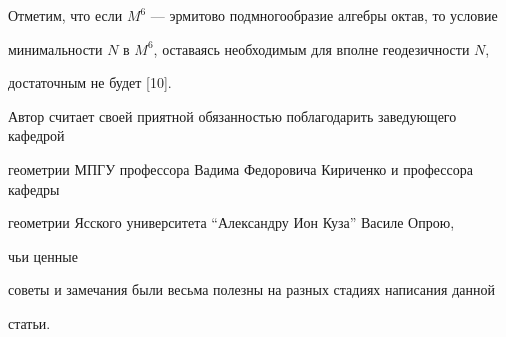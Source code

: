 Отметим, что если $M^6$ --- эрмитово подмногообразие алгебры октав, то условие 


минимальности $N$ в $M^6$, оставаясь необходимым для вполне геодезичности $N$,


достаточным не будет [10].





Автор считает своей приятной обязанностью поблагодарить заведующего кафедрой 


геометрии МПГУ профессора Вадима Федоровича Кириченко и профессора кафедры


геометрии Ясского университета ``Александру Ион Куза'' Василе Опрою, 


чьи ценные 


советы и замечания были весьма полезны на разных стадиях написания данной 


статьи.








